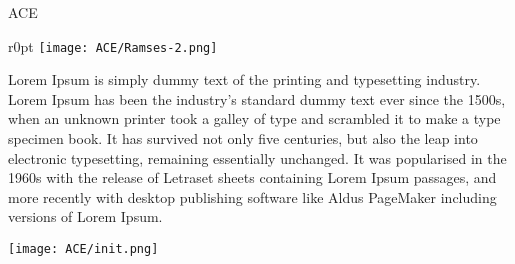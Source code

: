 \begin{section}{ACE}{}
  \begin{minipage}{\linewidth}
    \begin{wrapfigure}{r}{0pt}
      \texttt{[image: ACE/Ramses-2.png]}
    \end{wrapfigure}
    \strut {\small Lorem Ipsum is simply dummy text of the printing and
      typesetting industry. Lorem Ipsum has been the industry's standard dummy
      text ever since the 1500s, when an unknown printer took a galley of type
      and scrambled it to make a type specimen book. It has survived not only
      five centuries, but also the leap into electronic typesetting, remaining
      essentially unchanged. It was popularised in the 1960s with the release of
      Letraset sheets containing Lorem Ipsum passages, and more recently with
      desktop publishing software like Aldus PageMaker including versions of
      Lorem Ipsum.}
  \end{minipage}

  \vspace{0.5cm}

  \begin{minipage}{\linewidth}
    \begin{center}
      \texttt{[image: ACE/init.png]}
    \end{center}
  \end{minipage}
\end{section}